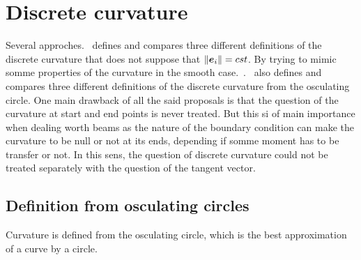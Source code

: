 \section{Discrete curvature}
Several approches.~\cite{Vouga2014} defines and compares three different definitions of the discrete curvature that does not suppose that $\lVert\boldsymbol{e}_i\rVert = cst$. By trying to mimic somme properties of the curvature in the smooth case.~\cite{Bobenko2015}.~\cite{Carroll2014} also defines and compares three different definitions of the discrete curvature from the osculating circle. One main drawback of all the said proposals is that the question of the curvature at  start and end points is never treated. But this si of main importance when dealing worth beams as the nature of the boundary condition can make the curvature to be null or not at its ends, depending if somme moment has to be transfer or not. In this sens, the question of discrete curvature could not be treated separately with the question of the tangent vector.
%
%


\cite{Romon2013}

\subsection{Definition from osculating circles}
Curvature is defined from the osculating circle, which is the best approximation of a curve by a circle.

